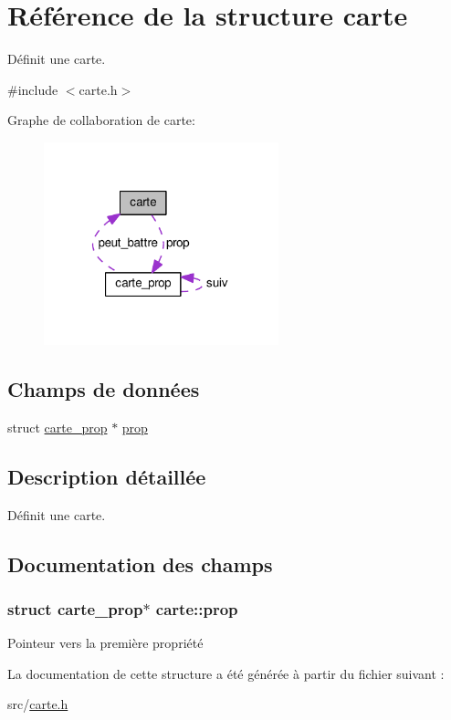 \hypertarget{structcarte}{}\section{Référence de la structure carte}
\label{structcarte}


Définit une carte.  




{\ttfamily \#include $<$carte.\+h$>$}



Graphe de collaboration de carte\+:
\nopagebreak
\begin{figure}[H]
\begin{center}
\leavevmode
\includegraphics[width=193pt]{structcarte__coll__graph}
\end{center}
\end{figure}
\subsection*{Champs de données}
\begin{DoxyCompactItemize}
\item 
struct \hyperlink{structcarte__prop}{carte\+\_\+prop} $\ast$ \hyperlink{structcarte_aa60e889514f9a3a4d33cc74fe0ad2eff}{prop}
\end{DoxyCompactItemize}


\subsection{Description détaillée}
Définit une carte. 

\subsection{Documentation des champs}
\subsubsection[{\texorpdfstring{prop}{prop}}]{\setlength{\rightskip}{0pt plus 5cm}struct {\bf carte\+\_\+prop}$\ast$ carte\+::prop}\hypertarget{structcarte_aa60e889514f9a3a4d33cc74fe0ad2eff}{}\label{structcarte_aa60e889514f9a3a4d33cc74fe0ad2eff}
Pointeur vers la première propriété 

La documentation de cette structure a été générée à partir du fichier suivant \+:\begin{DoxyCompactItemize}
\item 
src/\hyperlink{carte_8h}{carte.\+h}\end{DoxyCompactItemize}
